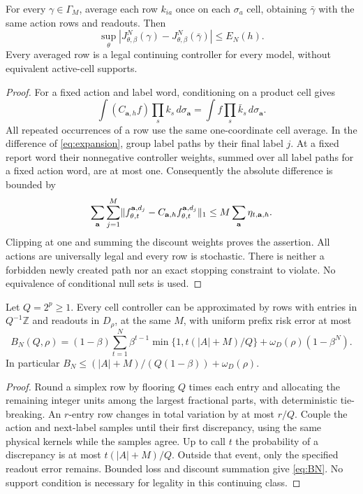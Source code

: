 \begin{lemma}\label{lem:average}
For every $\gamma\in\Gamma_M$, average each row $k_{ia}$ once on each $\sigma_a$ cell, obtaining $\bar\gamma$ with the same action rows and readouts. Then
\[
 \sup_\theta|J_{\theta,\beta}^N(\gamma)-J_{\theta,\beta}^N(\bar\gamma)|\le E_N(h).
\]
Every averaged row is a legal continuing controller for every model, without equivalent active-cell supports.
\end{lemma}
\begin{proof}
For a fixed action and label word, conditioning on a product cell gives
\[
 \int (C_{\mathbf a,h}f)\prod_s k_s\,d\sigma_{\mathbf a}
       =\int f\prod_s \bar k_s\,d\sigma_{\mathbf a}.
\]
All repeated occurrences of a row use the same one-coordinate cell average. In the difference of \eqref{eq:expansion}, group label paths by their final label $j$. At a fixed report word their nonnegative controller weights, summed over all label paths for a fixed action word, are at most one. Consequently the absolute difference is bounded by
\[
 \sum_{\mathbf a}\sum_{j=1}^M
 \lVert f_{\theta,t}^{\mathbf a,d_j}-C_{\mathbf a,h}f_{\theta,t}^{\mathbf a,d_j}\rVert_1
 \le M\sum_{\mathbf a}\eta_{t,\mathbf a,h}.
\]
Clipping at one and summing the discount weights proves the assertion. All actions are universally legal and every row is stochastic. There is neither a forbidden newly created path nor an exact stopping constraint to violate. No equivalence of conditional null sets is used.
\end{proof}

\begin{lemma}\label{lem:round}
Let $Q=2^p\ge1$. Every cell controller can be approximated by rows with entries in $Q^{-1}\mathbb Z$ and readouts in $D_\rho$, at the same $M$, with uniform prefix risk error at most
\begin{equation}\label{eq:BN}
 B_N(Q,\rho)=(1-\beta)\sum_{t=1}^N\beta^{t-1}
       \min\{1,t(|A|+M)/Q\}+\omega_D(\rho)(1-\beta^N).
\end{equation}
In particular $B_N\le (|A|+M)/(Q(1-\beta))+\omega_D(\rho)$.
\end{lemma}
\begin{proof}
Round a simplex row by flooring $Q$ times each entry and allocating the remaining integer units among the largest fractional parts, with deterministic tie-breaking. An $r$-entry row changes in total variation by at most $r/Q$. Couple the action and next-label samples until their first discrepancy, using the same physical kernels while the samples agree. Up to call $t$ the probability of a discrepancy is at most $t(|A|+M)/Q$. Outside that event, only the specified readout error remains. Bounded loss and discount summation give \eqref{eq:BN}. No support condition is necessary for legality in this continuing class.
\end{proof}

